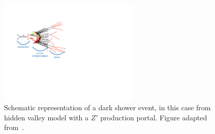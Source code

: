 \begin{enumerate}
\begin{figure}[t]\centering
\includegraphics[width=0.6\textwidth]{figures/DS_diagram}
\caption{Schematic representation of a dark shower event, in this case from hidden valley model with a $Z'$ production portal. Figure adapted from~\cite{Strassler:2008fv}.\label{fig:showerdiagram}}
\end{figure}
\end{enumerate}

